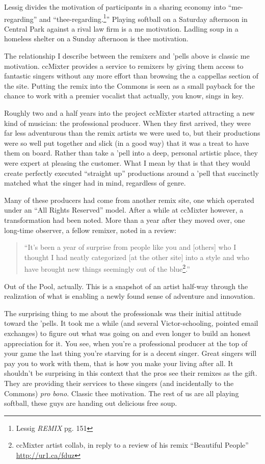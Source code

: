 Lessig divides the motivation of participants in a sharing economy into
``me-regarding'' and ``thee-regarding.\footnote{Lessig \textit{REMIX} pg. 151}''
Playing softball on a Saturday afternoon in Central Park against a rival law
f\hbox{}irm is a me motivation.  Ladling soup in a homeless shelter on a Sunday
afternoon is thee motivation.

The relationship I describe between the remixers and 'pells above is classic me
motivation. ccMixter provides a service to remixers by giving them access to
fantastic singers without any more ef\hbox{}fort than browsing the a cappellas section
of the site. Putting the remix into the Commons is seen as a small payback for
the chance to work with a premier vocalist that actually, you know, sings in
key.

Roughly two and a half years into the project ccMixter started attracting a new
kind of musician: the professional producer. When they f\hbox{}irst arrived, they were
far less adventurous than the remix artists we were used to, but their
productions were so well put together and slick (in a good way) that it was a
treat to have them on board. Rather than take a 'pell into a deep, personal
artistic place, they were expert at pleasing the customer. What I mean by that
is that they would create perfectly executed ``straight up'' productions around
a 'pell that succinctly matched what the singer had in mind, regardless of
genre.

Many of these producers had come from another remix site, one which operated
under an ``All Rights Reserved'' model. After a while at ccMixter however, a
transformation had been noted. More than a year after they moved over, one
long-time observer, a fellow remixer, noted in a review:

\begin{quotation}
``It's been a year of surprise from people like you and [others] who I thought I
had neatly categorized [at the other site] into a style and who have brought new
things seemingly out of the blue\footnote{ccMixter artist collab, in reply to a
review of his remix ``Beautiful People''\\ 
\url{http://ur1.ca/fduz}}.''
\end{quotation}

Out of the Pool, actually. This is a snapshot of an artist half-way through the
realization of what is enabling a newly found sense of adventure and innovation.

The surprising thing to me about the professionals was their initial attitude
toward the 'pells. It took me a while (and several Victor-schooling, pointed
email exchanges) to f\hbox{}igure out what was going on and even longer to build an
honest appreciation for it. You see, when you're a professional producer at the
top of your game the last thing you're starving for is a decent singer. Great
singers will pay you to work with them, that is how you make your living after
all. It shouldn't be surprising in this context that the pros see their remixes
as the gift. They are providing their services to these singers (and
incidentally to the Commons) \textit{pro bono}. Classic thee motivation. The rest of us
are all playing softball, these guys are handing out delicious free soup.

